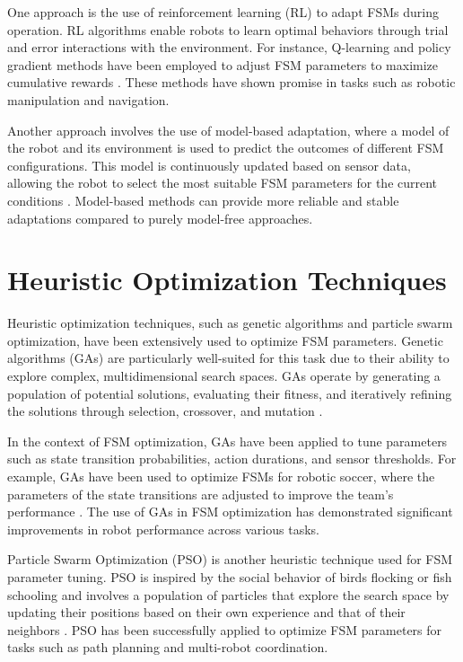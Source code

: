 \documentclass{ULBreport}
\begin{document}
One approach is the use of reinforcement learning (RL) to adapt FSMs during operation. RL algorithms enable robots to learn optimal behaviors through trial and error interactions with the environment. For instance, Q-learning and policy gradient methods have been employed to adjust FSM parameters to maximize cumulative rewards \cite{Kober2013}. These methods have shown promise in tasks such as robotic manipulation and navigation.

Another approach involves the use of model-based adaptation, where a model of the robot and its environment is used to predict the outcomes of different FSM configurations. This model is continuously updated based on sensor data, allowing the robot to select the most suitable FSM parameters for the current conditions \cite{Kormushev2013}. Model-based methods can provide more reliable and stable adaptations compared to purely model-free approaches.

\section{Heuristic Optimization Techniques}
Heuristic optimization techniques, such as genetic algorithms and particle swarm optimization, have been extensively used to optimize FSM parameters. Genetic algorithms (GAs) are particularly well-suited for this task due to their ability to explore complex, multidimensional search spaces. GAs operate by generating a population of potential solutions, evaluating their fitness, and iteratively refining the solutions through selection, crossover, and mutation \cite{Goldberg1989}.

In the context of FSM optimization, GAs have been applied to tune parameters such as state transition probabilities, action durations, and sensor thresholds. For example, GAs have been used to optimize FSMs for robotic soccer, where the parameters of the state transitions are adjusted to improve the team's performance \cite{Hoffmann2010}. The use of GAs in FSM optimization has demonstrated significant improvements in robot performance across various tasks.

Particle Swarm Optimization (PSO) is another heuristic technique used for FSM parameter tuning. PSO is inspired by the social behavior of birds flocking or fish schooling and involves a population of particles that explore the search space by updating their positions based on their own experience and that of their neighbors \cite{Kennedy1995}. PSO has been successfully applied to optimize FSM parameters for tasks such as path planning and multi-robot coordination.
\end{document}
